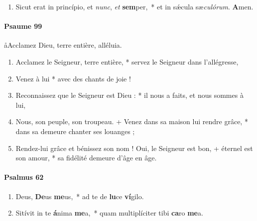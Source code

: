 \documentclass[twoside]{article}
\begin{document}
\begin{paracol}[1]{2}
\begin{enumerate}[wide, itemsep=0mm, labelwidth=!, labelindent=0pt, label=\color{gregoriocolor}\theenumi]
\item Sicut erat in princípio, et \textit{nunc}, \textit{et} \textbf{sem}per,~* et in sǽcula sæ\textit{cu}\textit{ló}\textit{rum}. \textbf{A}men.
\end{enumerate}

\switchcolumn

\paragraph{Psaume 99}
\aa Acclamez Dieu, terre entière, alléluia.



\begin{enumerate}[wide, itemsep=0mm, labelwidth=!, labelindent=0pt, label=\color{gregoriocolor}\theenumi]

\item Acclamez le Seigneur, terre entière, *
servez le Seigneur dans l'allégresse,

\item Venez à lui *
avec des chants de joie !

\item Reconnaissez que le Seigneur est Dieu : *
il nous a faits, et nous sommes à lui,

\item Nous, son peuple, son troupeau. +
Venez dans sa maison lui rendre grâce, *
dans sa demeure chanter ses louanges ;

\item Rendez-lui grâce et bénissez son nom ! Oui, le Seigneur est bon, +
éternel est son amour, *
sa fidélité demeure d'âge en âge.


\end{enumerate}
\switchcolumn*

\paragraph{Psalmus 62}



\begin{enumerate}[wide, itemsep=0mm, labelwidth=!, labelindent=0pt, label=\color{gregoriocolor}\theenumi]
\item Deus, \textbf{De}us \textbf{me}us,~* ad te de \textbf{lu}ce \textbf{ví}gilo.

\item Sitívit in te \textbf{á}nima \textbf{me}a,~* quam multiplíciter tibi \textbf{ca}ro \textbf{me}a.


\end{enumerate}
\end{paracol}
\end{document}
